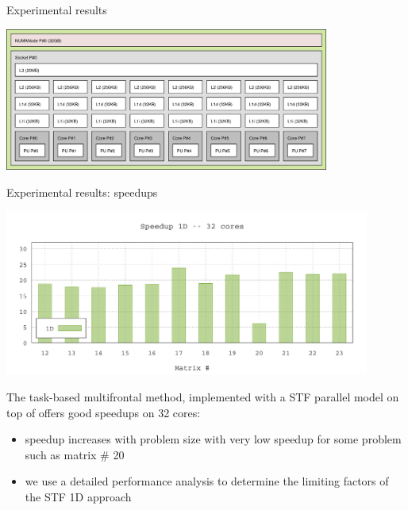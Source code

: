 \begin{frame}{Experimental results}
  \begin{center}
    \includegraphics[width=0.8\textwidth]{figures/ada}
  \end{center}
    
\end{frame}

\begin{frame}{Experimental results: speedups}
  \begin{center}
    \includegraphics[width=0.9\textwidth]{data/su_ada_toms_1d}
  \end{center}
  
  The task-based multifrontal method, implemented with a STF parallel
  model on top of \starpu offers good speedups on 32 cores:

  \begin{itemize}
  \item speedup increases with problem size with very low speedup for
    some problem such as matrix \# 20
  \item we use a detailed performance analysis to determine the
    limiting factors of the STF 1D approach
  \end{itemize}

\end{frame}

